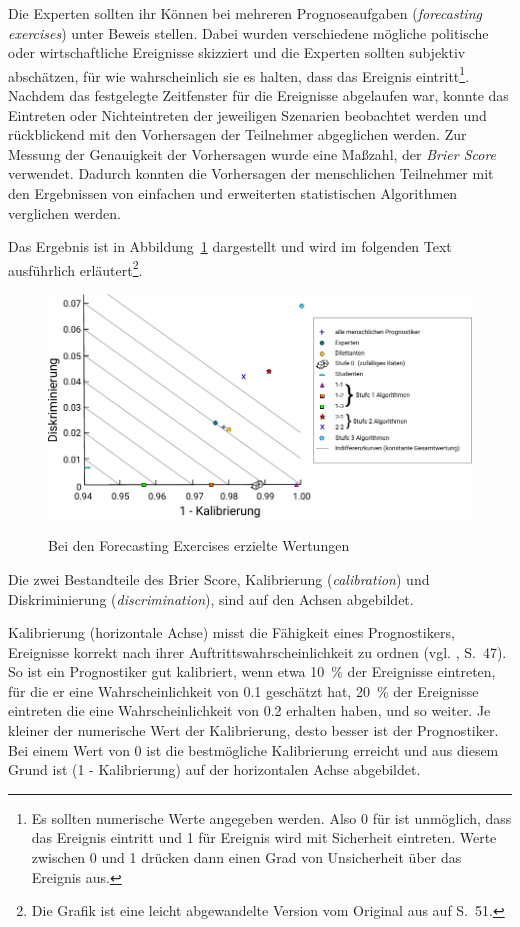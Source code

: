 Die Experten sollten ihr Können bei mehreren Prognoseaufgaben
(\emph{forecasting exercises}) unter Beweis stellen. Dabei wurden verschiedene
mögliche politische oder wirtschaftliche Ereignisse skizziert und die Experten
sollten subjektiv abschätzen, für wie wahrscheinlich sie es halten, dass das
Ereignis eintritt\footnote{Es sollten numerische Werte angegeben werden. Also
0 für  ist unmöglich, dass das Ereignis eintritt\grqq{} und 1 für
 Ereignis wird mit Sicherheit eintreten\grqq{}. Werte zwischen 0 und 1
drücken dann einen Grad von Unsicherheit über das Ereignis aus.}.
Nachdem das festgelegte Zeitfenster für die Ereignisse abgelaufen war, konnte
das Eintreten oder Nichteintreten der jeweiligen Szenarien beobachtet werden und
rückblickend mit den Vorhersagen der Teilnehmer abgeglichen werden.  
Zur Messung der Genauigkeit der Vorhersagen wurde eine Maßzahl,
der \emph{Brier Score} verwendet. Dadurch konnten die Vorhersagen der
menschlichen Teilnehmer mit den Ergebnissen von einfachen und erweiterten
statistischen Algorithmen verglichen werden.

Das Ergebnis ist in Abbildung~\ref{pic:Tetlock_1} dargestellt und wird im
folgenden Text ausführlich erläutert\footnote{Die Grafik ist eine leicht 
abgewandelte Version vom Original aus \cite{Tetlock} auf S.~51.}.

\begin{figure}%
\centering
\caption{Bei den Forecasting Exercises erzielte Wertungen}
\includegraphics[scale=1.0]{Grafiken/Tetlock_1_Fertig_Ink.pdf} 
\label{pic:Tetlock_1}
\end{figure}
\label{Kal_Dis}

Die zwei
Bestandteile des Brier Score, Kalibrierung (\emph{calibration}) und
Diskriminierung (\emph{discrimination}), sind auf den Achsen abgebildet.

Kalibrierung (horizontale Achse) misst die Fähigkeit eines Prognostikers,
Ereignisse korrekt nach ihrer
Auftrittswahrscheinlichkeit zu ordnen (vgl. \cite{Tetlock}, S.~47). So ist ein
Prognostiker gut kalibriert, wenn etwa 10~\% der Ereignisse eintreten, für die
er eine Wahrscheinlichkeit von 0.1 geschätzt hat, 20~\% der Ereignisse eintreten
die eine Wahrscheinlichkeit von 0.2 erhalten haben, und so weiter. Je kleiner
der numerische Wert der Kalibrierung, desto besser ist der Prognostiker. Bei
einem Wert von 0 ist die bestmögliche Kalibrierung erreicht und aus diesem Grund
ist (1 - Kalibrierung) auf der horizontalen Achse abgebildet.

